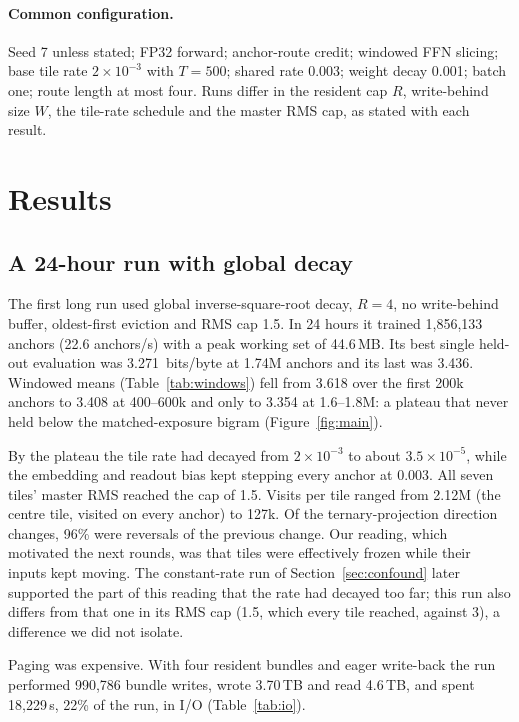 \documentclass[10pt]{article}
\newcommand{\bpb}{bits/byte}
\begin{document}
\paragraph{Common configuration.} Seed 7 unless stated; FP32 forward; anchor-route credit; windowed FFN slicing;
base tile rate $2\times10^{-3}$ with $T=500$; shared rate 0.003; weight decay 0.001; batch one;
route length at most four. Runs differ in the resident cap $R$, write-behind size $W$, the tile-rate
schedule and the master RMS cap, as stated with each result.

\section{Results}
\label{sec:results}

\subsection{A 24-hour run with global decay}
\label{sec:global}

The first long run used global inverse-square-root decay, $R=4$, no write-behind buffer, oldest-first
eviction and RMS cap 1.5. In 24 hours it trained 1,856,133 anchors (22.6 anchors/s) with a peak
working set of 44.6\,MB. Its best single held-out evaluation was 3.271~\bpb{} at 1.74M anchors and its
last was 3.436. Windowed means (Table~\ref{tab:windows}) fell from 3.618 over the first 200k anchors
to 3.408 at 400--600k and only to 3.354 at 1.6--1.8M: a plateau that never held below the
matched-exposure bigram (Figure~\ref{fig:main}).

By the plateau the tile rate had decayed from $2\times10^{-3}$ to about $3.5\times10^{-5}$, while the
embedding and readout bias kept stepping every anchor at 0.003. All seven tiles' master RMS reached
the cap of 1.5. Visits per tile ranged from 2.12M (the centre tile, visited on every anchor) to 127k.
Of the ternary-projection direction changes, 96\% were reversals of the previous change. Our reading,
which motivated the next rounds, was that tiles were effectively frozen while their inputs kept
moving. The constant-rate run of Section~\ref{sec:confound} later supported the part of this reading
that the rate had decayed too far; this run also differs from that one in its RMS cap (1.5, which
every tile reached, against 3), a difference we did not isolate.

Paging was expensive. With four resident bundles and eager write-back the run performed 990,786 bundle
writes, wrote 3.70\,TB and read 4.6\,TB, and spent 18,229\,s, 22\% of the run, in I/O
(Table~\ref{tab:io}).
\end{document}
